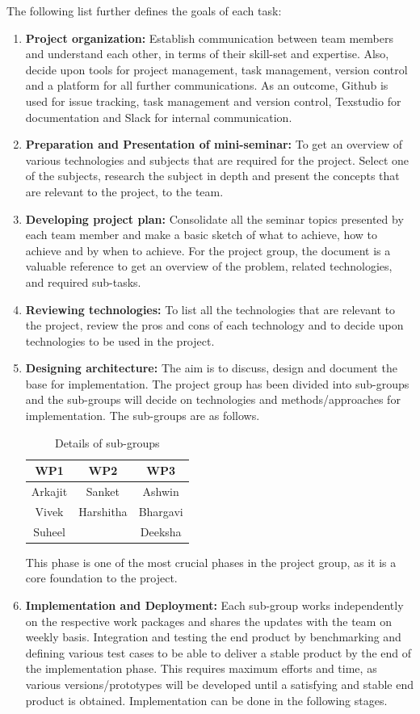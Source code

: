 The following list further defines the goals of each task: 
\begin{enumerate}
	\item \textbf{Project organization:}
	Establish communication between team members and understand each other, in terms of their skill-set and expertise. Also, decide upon tools for project management, task management, version control and a platform for all further communications. As an outcome, Github is used for issue tracking, task management and version control, Texstudio for documentation and Slack for internal communication.
	\item \textbf{Preparation and Presentation of mini-seminar:}
	To get an overview of various technologies and subjects that are required for the project. Select one of the subjects, research the subject in depth and present the concepts that are relevant to the project, to the team.
	\item \textbf{Developing project plan:}
	Consolidate all the seminar topics presented by each team member and make a basic sketch of what to achieve, how to achieve and by when to achieve. For the project group, the document is a valuable reference to get an overview of the problem, related technologies, and required sub-tasks. 
	\item \textbf{Reviewing technologies:}
	To list all the technologies that are relevant to the project, review the pros and cons of each technology and to decide upon technologies to be used in the project.
	\item \textbf{Designing architecture:}
 The aim is to discuss, design and document the base for implementation. The project group has been divided into sub-groups and the sub-groups will decide on technologies and methods/approaches for implementation. The sub-groups are as follows.
 
\begin{table} [h]
	\centering
	\begin{tabular}{|c|c|c|}
		\hline
		WP1 & WP2 & WP3 \\
		\hline
		Arkajit & Sanket & Ashwin \\
		\hline
		Vivek &	Harshitha & Bhargavi \\
		\hline
		Suheel &  & Deeksha \\
		\hline
	\end{tabular}
	\caption{Details of sub-groups}
\end{table}
	
	This phase is one of the most crucial phases in the project group, as it is a core foundation to the project.
	\item \textbf{Implementation and Deployment:}
	 Each sub-group works independently on the respective work packages and shares the updates with the team on weekly basis. Integration and testing the end product by benchmarking and defining various test cases to be able to deliver a stable product by the end of the implementation phase. This requires maximum efforts and time, as various versions/prototypes will be developed until a satisfying and stable end product is obtained. Implementation can be done in the following stages.
	

\end{enumerate}

